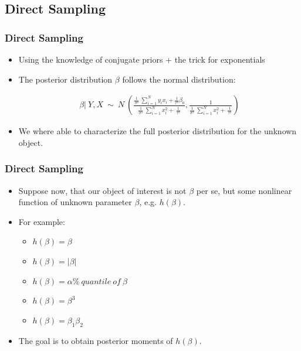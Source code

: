 \documentclass[
  shownotes,
  xcolor={svgnames},
  hyperref={colorlinks,citecolor=DarkBlue,linkcolor=DarkRed,urlcolor=DarkBlue}
  , aspectratio=169]{beamer}
\begin{document}
\subsection{Direct Sampling}
\begin{frame}[fragile]
\frametitle{Direct Sampling}


\begin{itemize}
\item Using the knowledge of conjugate priors + the trick for exponentials
\medskip

\item The posterior distribution $\beta$ follows the normal distribution:
\bigskip

\begin{align}
\beta|\ Y,X\ \sim\ N\ \left(\frac{\frac{1}{\sigma^{2}}\ \sum_{i = 1}^{N}{y_{i}x_{i} + \frac{1}{\tau^{2}}\beta_{0}}}{\frac{1}{\sigma^{2}}\ \sum_{i = 1}^{N}{x_{i}^{2} + \ \frac{1}{\tau^{2}}}},\frac{1}{\frac{1}{\sigma^{2}}\ \sum_{i = 1}^{N}{x_{i}^{2} + \ \frac{1}{\tau^{2}}}}\right)
\end{align}
\bigskip
\item We where able to characterize the full posterior distribution for the unknown object.
\end{itemize}
\end{frame}
\begin{frame}[fragile]
\frametitle{Direct Sampling}

\begin{itemize}
\item Suppose now, that our object of interest is not $\beta$ per se, but some nonlinear function of unknown parameter $\beta$, e.g. $h(\beta)$.
\medskip
\item  For example:
\medskip
\begin{itemize}
\item $h\left( \beta \right) = \beta$

\item $h\left( \beta \right) = |\beta|$

\item $h\left( \beta \right) = \alpha\%\ quantile\ of\ \beta$

\item $h\left( \beta \right) = \beta^{3}$

\item $h\left( \beta \right) = \beta_{1}\beta_{2}$
\end{itemize}
\medskip
\item  The goal is to obtain posterior moments of $h\left( \beta \right)$.
\end{itemize}
\end{frame}
\end{document}
